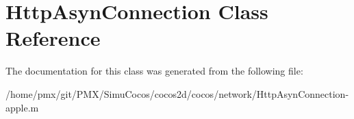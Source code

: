 \hypertarget{classHttpAsynConnection}{}\section{Http\+Asyn\+Connection Class Reference}
\label{classHttpAsynConnection}


The documentation for this class was generated from the following file\+:\begin{DoxyCompactItemize}
\item 
/home/pmx/git/\+P\+M\+X/\+Simu\+Cocos/cocos2d/cocos/network/Http\+Asyn\+Connection-\/apple.\+m\end{DoxyCompactItemize}
